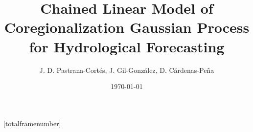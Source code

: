 \author{%
	J. D. Pastrana-Cortés, J. Gil-González, D. Cárdenas-Peña
}


\title[Chained LMC GP for Hydrological Forecasting]{\textbf{Chained Linear Model of Coregionalization Gaussian Process for Hydrological Forecasting}}
\date[2025]{\today}



[totalframenumber]
